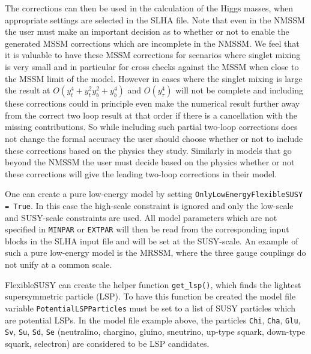 \documentclass[final,3p,11pt,pdflatex]{elsarticle}
\makeatletter
\newcommand{\fs}{FlexibleSUSY\@\xspace}
\newcommand{\code}[1]{\lstinline|#1|}  %
\makeatother
\begin{document}
 The corrections can then be used in the calculation of the Higgs
 masses, when appropriate settings are selected in the SLHA file. Note
 that even in the NMSSM the user must make an important decision as
 to whether or not to enable the generated MSSM corrections which are
 incomplete in the NMSSM.  We feel that it is valuable to have
 these MSSM corrections for scenarios where singlet mixing is
 very small and in particular for cross checks against the MSSM when
 close to the MSSM limit of the model.  However in cases where the
 singlet mixing is large the result at $O(y_t^4 + y_t^2 y_b^2 +
 y_b^4)$ and $O(y_\tau^4)$ will not be complete and including these
 corrections could in principle even make the numerical result further
 away from the correct two loop result at that order if there is a
 cancellation with the missing contributions.  So while including such
 partial two-loop corrections does not change the formal accuracy
 the user should choose whether or not to include these corrections
 based on the physics they study.  Similarly in models that go beyond
 the NMSSM the user must decide based on the physics whether or not these
 corrections will give the leading two-loop corrections in their
 model.


One can create a pure low-energy model by setting
\code{OnlyLowEnergyFlexibleSUSY = True}.  In this case the high-scale
constraint is ignored and only the low-scale and SUSY-scale
constraints are used.  All model parameters which are not specified in
\code{MINPAR} or \code{EXTPAR} will then be read from the
corresponding input blocks in the SLHA input file and will be set at
the SUSY-scale.  An example of such a pure low-energy model is the
MRSSM, where the three gauge couplings do not unify at a common scale.

\fs can create the helper function \code{get_lsp()}, which finds the
lightest supersymmetric particle (LSP).  To have this function be
created the model file variable \code{PotentialLSPParticles} must be
set to a list of SUSY particles which are potential LSPs.  In the
model file example above, the particles \code{Chi}, \code{Cha},
\code{Glu}, \code{Sv}, \code{Su}, \code{Sd}, \code{Se} (neutralino,
chargino, gluino, sneutrino, up-type squark, down-type squark,
selectron) are considered to be LSP candidates.
\end{document}
